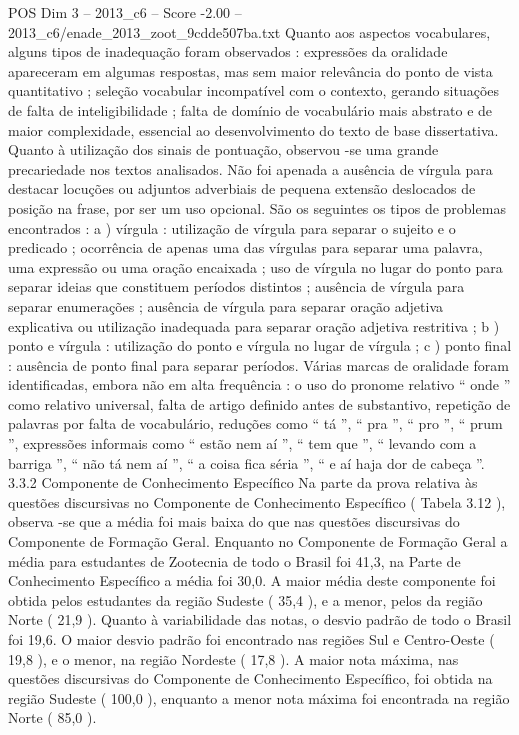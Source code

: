 \begin{textsample}{POS Dim 3 – 2013\_c6 – Score -2.00 – 2013\_c6/enade\_2013\_zoot\_9cdde507ba.txt}
Quanto aos aspectos vocabulares, alguns tipos de inadequação foram observados : expressões da oralidade apareceram em algumas respostas, mas sem maior relevância do ponto de vista quantitativo ; seleção vocabular incompatível com o contexto, gerando situações de falta de inteligibilidade ; falta de domínio de vocabulário mais abstrato e de maior complexidade, essencial ao desenvolvimento do texto de base dissertativa.
Quanto à utilização dos sinais de pontuação, observou -se uma grande precariedade nos textos analisados.
Não foi apenada a ausência de vírgula para destacar locuções ou adjuntos adverbiais de pequena extensão deslocados de posição na frase, por ser um uso opcional.
São os seguintes os tipos de problemas encontrados : a ) vírgula : utilização de vírgula para separar o sujeito e o predicado ; ocorrência de apenas uma das vírgulas para separar uma palavra, uma expressão ou uma oração encaixada ; uso de vírgula no lugar do ponto para separar ideias que constituem períodos distintos ; ausência de vírgula para separar enumerações ; ausência de vírgula para separar oração adjetiva explicativa ou utilização inadequada para separar oração adjetiva restritiva ; b ) ponto e vírgula : utilização do ponto e vírgula no lugar de vírgula ; c ) ponto final : ausência de ponto final para separar períodos.
Várias marcas de oralidade foram identificadas, embora não em alta frequência : o uso do pronome relativo “ onde ” como relativo universal, falta de artigo definido antes de substantivo, repetição de palavras por falta de vocabulário, reduções como “ tá ”, “ pra ”, “ pro ”, “ prum ”, expressões informais como “ estão nem aí ”, “ tem que ”, “ levando com a barriga ”, “ não tá nem aí ”, “ a coisa fica séria ”, “ e aí haja dor de cabeça ”. 3.3.2 Componente de Conhecimento Específico Na parte da prova relativa às questões discursivas no Componente de Conhecimento Específico ( Tabela 3.12 ), observa -se que a média foi mais baixa do que nas questões discursivas do Componente de Formação Geral.
Enquanto no Componente de Formação Geral a média para estudantes de Zootecnia de todo o Brasil foi 41,3, na Parte de Conhecimento Específico a média foi 30,0.
A maior média deste componente foi obtida pelos estudantes da região Sudeste ( 35,4 ), e a menor, pelos da região Norte ( 21,9 ).
Quanto à variabilidade das notas, o desvio padrão de todo o Brasil foi 19,6.
O maior desvio padrão foi encontrado nas regiões Sul e Centro-Oeste ( 19,8 ), e o menor, na região Nordeste ( 17,8 ).
A maior nota máxima, nas questões discursivas do Componente de Conhecimento Específico, foi obtida na região Sudeste ( 100,0 ), enquanto a menor nota máxima foi encontrada na região Norte ( 85,0 ).

\end{textsample}

